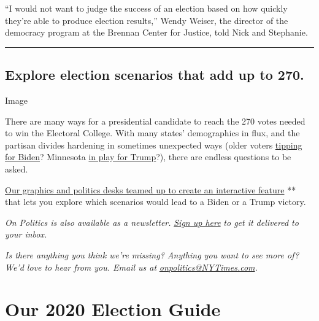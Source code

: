 ``I would not want to judge the success of an election based on how
quickly they're able to produce election results,'' Wendy Weiser, the
director of the democracy program at the Brennan Center for Justice,
told Nick and Stephanie.

\begin{center}\rule{0.5\linewidth}{\linethickness}\end{center}

\hypertarget{explore-election-scenarios-that-add-up-to-270}{%
\subsection{Explore election scenarios that add up to
270.}\label{explore-election-scenarios-that-add-up-to-270}}

Image

There are many ways for a presidential candidate to reach the 270 votes
needed to win the Electoral College. With many states' demographics in
flux, and the partisan divides hardening in sometimes unexpected ways
(older voters
\href{https://www.nytimes3xbfgragh.onion/2020/05/09/us/politics/trump-older-voters-2020.html}{tipping
for Biden}? Minnesota
\href{https://www.nytimes3xbfgragh.onion/2019/10/09/us/politics/trump-minnesota-2020.html}{in
play for Trump}?), there are endless questions to be asked.

\href{https://www.nytimes3xbfgragh.onion/interactive/2020/us/elections/election-states-biden-trump.html?action=click\&pgtype=Article\&state=default\&module=styln-elections-2020\&region=TOP_BANNER\&context=storylines_menu}{Our
graphics and politics desks teamed up to create an interactive feature}
** that lets you explore which scenarios would lead to a Biden or a
Trump victory.

\emph{On Politics is also available as a newsletter.}
\href{https://www.nytimes3xbfgragh.onion/newsletters/politics}{\emph{Sign
up here}} \emph{to get it delivered to your inbox.}

\emph{Is there anything you think we're missing? Anything you want to
see more of? We'd love to hear from you. Email us at}
\href{mailto:onpolitics@NYTimes.com}{\emph{onpolitics@NYTimes.com}}\emph{.}

\hypertarget{our-2020-election-guide}{%
\section{Our 2020 Election Guide}\label{our-2020-election-guide}}

